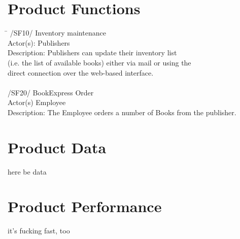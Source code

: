 \documentclass[a4paper]{article}
\begin{document}
\section{Product Functions}
\begin{tabbing}
\hspace{3cm}\=\kill
  /SF10/ \> Inventory maintenance \\ 
  Actor(s): \> Publishers\\ 
  Description: \> Publishers can update their inventory list\\ \> (i.e. the list of available books) either via   	mail or using the \\ \> direct connection over the web-based interface.\\
  \\
  /SF20/ \> BookExpress Order \\
  Actor(s) \> Employee \\
  Description: \> The Employee orders a number of Books from the publisher.
 
\end{tabbing} 
\section{Product Data}
here be data
\\
\section{Product Performance}
it's fucking fast, too
\end{document}
